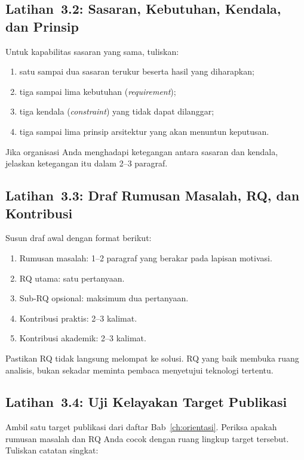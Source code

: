 \subsection*{Latihan~3.2: Sasaran, Kebutuhan, Kendala, dan Prinsip}

Untuk kapabilitas sasaran yang sama, tuliskan:

\begin{enumerate}
  \item satu sampai dua sasaran terukur beserta hasil yang diharapkan;
  \item tiga sampai lima kebutuhan (\emph{requirement});
  \item tiga kendala (\emph{constraint}) yang tidak dapat dilanggar;
  \item tiga sampai lima prinsip arsitektur yang akan menuntun keputusan.
\end{enumerate}

Jika organisasi Anda menghadapi ketegangan antara sasaran dan kendala, jelaskan
ketegangan itu dalam 2--3 paragraf.

\subsection*{Latihan~3.3: Draf Rumusan Masalah, RQ, dan Kontribusi}

Susun draf awal dengan format berikut:

\begin{enumerate}
  \item Rumusan masalah: 1--2 paragraf yang berakar pada lapisan motivasi.
  \item RQ utama: satu pertanyaan.
  \item Sub-RQ opsional: maksimum dua pertanyaan.
  \item Kontribusi praktis: 2--3 kalimat.
  \item Kontribusi akademik: 2--3 kalimat.
\end{enumerate}

Pastikan RQ tidak langsung melompat ke solusi. RQ yang baik membuka ruang
analisis, bukan sekadar meminta pembaca menyetujui teknologi tertentu.

\subsection*{Latihan~3.4: Uji Kelayakan Target Publikasi}

Ambil satu target publikasi dari daftar Bab~\ref{ch:orientasi}. Periksa apakah
rumusan masalah dan RQ Anda cocok dengan ruang lingkup target tersebut.
Tuliskan catatan singkat:

